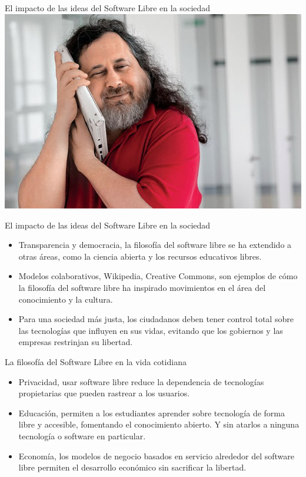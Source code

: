 \documentclass{beamer}
\begin{document}
\begin{frame}{El impacto de las ideas del Software Libre en la sociedad}
  \includegraphics[width=\linewidth]{images/amor.jpg}
\end{frame}

\begin{frame}{El impacto de las ideas del Software Libre en la sociedad}
  \begin{itemize}
    \item Transparencia y democracia, la filosofía del software libre se ha
      extendido  a otras áreas, como la ciencia abierta y los recursos
      educativos libres. \pause
    \item Modelos colaborativos, Wikipedia, Creative Commons, son ejemplos de
      cómo la filosofía del software libre  ha inspirado movimientos en el área
      del conocimiento y la cultura. \pause
    \item Para una sociedad más justa, los ciudadanos deben tener control total
      sobre las tecnologías que influyen en sus vidas, evitando que los
      gobiernos y las empresas restrinjan su libertad.
  \end{itemize}
\end{frame}

\begin{frame}{La filosofía del Software Libre en la vida cotidiana}
  \begin{itemize}
    \item Privacidad, usar software libre reduce la dependencia de tecnologías propietarias
      que pueden rastrear a los usuarios. \pause
    \item Educación, permiten a los estudiantes aprender sobre tecnología de
      forma libre y accesible, fomentando el conocimiento abierto. Y sin atarlos
      a ninguna tecnología o software en particular. \pause
    \item Economía, los modelos de negocio basados en servicio alrededor del
      software libre permiten el desarrollo económico sin sacrificar la libertad.
  \end{itemize}
\end{frame}
\end{document}
